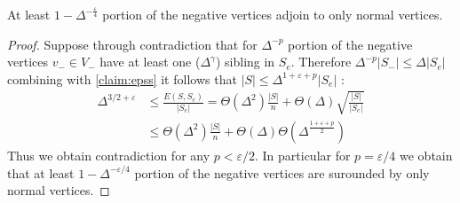 \begin{claim}
  At least $ 1- \Delta^{-\frac{\varepsilon}{4}}$ portion of the negative vertices adjoin to only normal vertices. 
\end{claim}
\begin{proof}
  Suppose through contradiction that for $\Delta^{-p}$ portion of the negative vertices $v_{-}\in V_{-}$ have at least one ($\Delta^{\gamma}$) sibling in $S_{e}$. Therefore $ \Delta^{-p} |S_{-}| \le \Delta |S_{e}|$ combining with \cref{claim:epss} it follows that $|S| \le \Delta^{1+\varepsilon + p }|S_{e}|$ : 
  \begin{equation*}
    \begin{split}
      \Delta^{3/2 + \varepsilon} & \le \frac{E(S,S_{e})}{|S_{e}|} = \Theta\left( \Delta^{2} \right)\frac{|S|}{n} + \Theta\left( \Delta \right)\sqrt{ \frac{|S|}{|S_{e}|}  }\\ 
      & \le \Theta(\Delta^{2}) \frac{|S|}{n} + \Theta(\Delta) \Theta\left( \Delta^{\frac{1+\varepsilon + p}{2}} \right)  
    \end{split}
  \end{equation*} 
  Thus we obtain contradiction for any $p < \varepsilon/2$. In particular for $p = \varepsilon/4$ we obtain that at least $1 - \Delta^{-\varepsilon/4}$ portion of the negative vertices are surounded by only normal vertices. 
 \end{proof}

